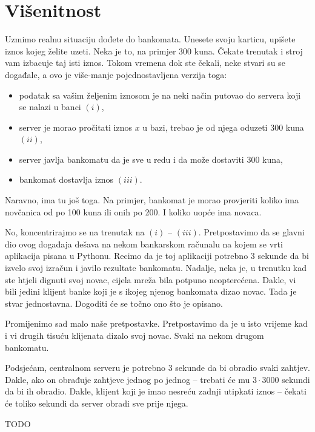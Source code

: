 \chapter{Višenitnost}

Uzmimo realnu situaciju dođete do bankomata. Unesete svoju karticu, upišete
iznos kojeg želite uzeti. Neka je to, na primjer 300 kuna. Čekate trenutak i
stroj vam izbacuje taj isti iznos. Tokom vremena dok ste čekali, neke stvari
su se događale, a ovo je više-manje pojednostavljena verzija toga:

\begin{itemize}
	\item podatak sa vašim željenim iznosom je na neki način putovao do
		servera koji se nalazi u banci $(i)$,
	\item server je morao pročitati iznos $x$ u bazi, trebao je od njega
		oduzeti 300 kuna $(ii)$,
	\item server javlja bankomatu da je sve u redu i da može dostaviti
		300 kuna,
	\item bankomat dostavlja iznos $(iii)$.
\end{itemize}

Naravno, ima tu još toga. Na primjer, bankomat je morao provjeriti koliko ima
novčanica od po 100 kuna ili onih po 200. I koliko uopće ima novaca. 

No, koncentrirajmo se na trenutak na $(i)$ -- $(iii)$. Pretpostavimo da se glavni
dio ovog događaja dešava na nekom bankarskom računalu na kojem se vrti aplikacija
pisana u Pythonu. Recimo da je toj aplikaciji potrebno 3 sekunde da bi izvelo
svoj izračun i javilo rezultate bankomatu. Nadalje, neka je, u trenutku kad ste
htjeli dignuti svoj novac, cijela mreža bila potpuno neopterećena. Dakle, vi bili
jedini klijent banke koji je s ikojeg njenog bankomata dizao novac. Tada je stvar
jednostavna. Dogoditi će se točno ono što je opisano.

Promijenimo sad malo naše pretpostavke. Pretpostavimo da je u isto vrijeme kad i vi
drugih tisuću klijenata dizalo svoj novac. Svaki na nekom drugom bankomatu. 

Podsjećam, centralnom serveru je potrebno $3$ sekunde da bi obradio svaki zahtjev.
Dakle, ako on obrađuje zahtjeve jednog po jednog -- trebati će mu $3\cdot 3000$
sekundi da bi ih obradio. Dakle, klijent koji je imao nesreću zadnji utipkati
iznos -- čekati će toliko sekundi da server obradi sve prije njega. 

TODO
